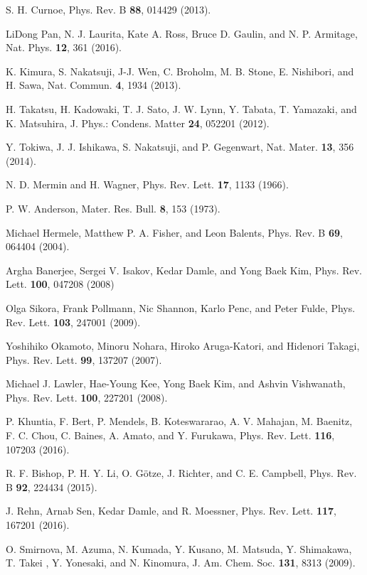 \documentclass[aps,prl,reprint,amsmath,amssymb,superscriptaddress,showpacs]{revtex4-1}
\begin{document}
\begin{thebibliography}{99}
 S. H. Curnoe, Phys. Rev. B \textbf{88}, 014429 (2013).

 LiDong Pan,	N. J. Laurita,	Kate A. Ross, Bruce D. Gaulin, and N. P. Armitage, Nat. Phys. \textbf{12}, 361 (2016).

 K. Kimura, S. Nakatsuji, J-J. Wen, C. Broholm, M. B. Stone, E. Nishibori, and H. Sawa, Nat. Commun. \textbf{4}, 1934 (2013).

 H. Takatsu, H. Kadowaki, T. J. Sato, J. W. Lynn, Y. Tabata, T. Yamazaki, and K. Matsuhira, J. Phys.: Condens. Matter \textbf{24}, 052201 (2012).

 Y. Tokiwa, J. J. Ishikawa, S. Nakatsuji, and P. Gegenwart, Nat. Mater. \textbf{13}, 356 (2014).

 N. D. Mermin and H. Wagner, Phys. Rev. Lett. \textbf{17}, 1133 (1966).

 P. W. Anderson, Mater. Res. Bull. \textbf{8}, 153 (1973).

 Michael Hermele, Matthew P. A. Fisher, and Leon Balents, Phys. Rev. B \textbf{69}, 064404 (2004).

 Argha Banerjee, Sergei V. Isakov, Kedar Damle, and Yong Baek Kim, Phys. Rev. Lett. \textbf{100}, 047208 (2008) 

 Olga Sikora, Frank Pollmann, Nic Shannon, Karlo Penc, and Peter Fulde, Phys. Rev. Lett. \textbf{103}, 247001 (2009).

 Yoshihiko Okamoto, Minoru Nohara, Hiroko Aruga-Katori, and Hidenori Takagi, Phys. Rev. Lett. \textbf{99}, 137207 (2007).

 Michael J. Lawler, Hae-Young Kee, Yong Baek Kim, and Ashvin Vishwanath, Phys. Rev. Lett. \textbf{100}, 227201 (2008).

 P. Khuntia, F. Bert, P. Mendels, B. Koteswararao, A. V. Mahajan, M. Baenitz, F. C. Chou, C. Baines, A. Amato, and Y. Furukawa, Phys. Rev. Lett. \textbf{116}, 107203 (2016).

 R. F. Bishop, P. H. Y. Li, O. G\"otze, J. Richter, and C. E. Campbell, Phys. Rev. B \textbf{92}, 224434 (2015).

 J. Rehn, Arnab Sen, Kedar Damle, and R. Moessner, Phys. Rev. Lett. \textbf{117}, 167201 (2016).

 O. Smirnova, M. Azuma, N. Kumada, Y. Kusano, M. Matsuda, Y. Shimakawa, T. Takei , Y. Yonesaki, and N. Kinomura, J. Am.
Chem. Soc. \textbf{131}, 8313 (2009).


\end{thebibliography}
\end{document}
